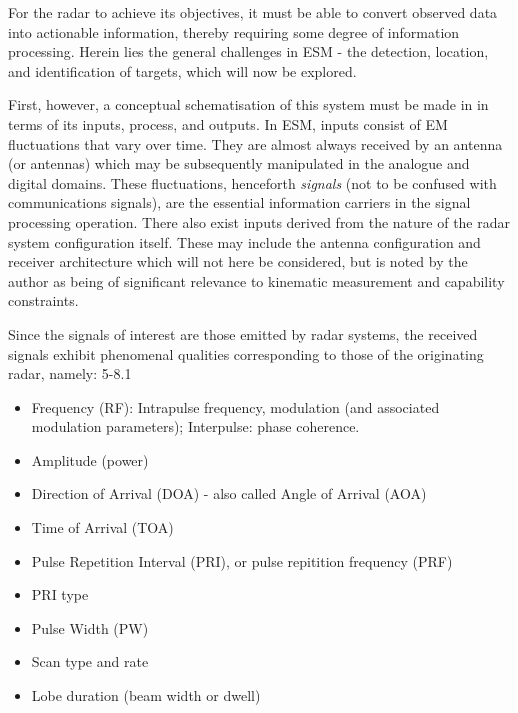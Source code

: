 

For the radar to achieve its objectives, it must be able to convert observed data into actionable information, thereby requiring some degree of information processing. Herein lies the general challenges in ESM - the detection, location, and identification of targets, which will now be explored. %

First, however, a conceptual schematisation of this system must be made in in terms of its inputs, process, and outputs. In ESM, inputs consist of EM fluctuations that vary over time. They are almost always received by an antenna (or antennas) which may be subsequently manipulated in the analogue and digital domains. These fluctuations, henceforth \textit{signals} (not to be confused with communications signals), are the essential information carriers in the signal processing operation. There also exist inputs derived from the nature of the radar system configuration itself. These may include the antenna configuration and receiver architecture which will not here be considered, but is noted by the author as being of significant relevance to kinematic measurement and capability constraints.


Since the signals of interest are those emitted by radar systems, the received signals exhibit phenomenal qualities corresponding to those of the originating radar, namely: \cite{avionics_department_electronic_2013} 5-8.1
\begin{itemize}
    \item Frequency (RF): Intrapulse frequency, modulation (and associated modulation parameters); Interpulse: phase coherence.
    \item Amplitude (power)
    \item Direction of Arrival (DOA) - also called Angle of Arrival (AOA)
    \item Time of Arrival (TOA)
    \item Pulse Repetition Interval (PRI), or pulse repitition frequency (PRF)
    \item PRI type
    \item Pulse Width (PW)
    \item Scan type and rate
    \item Lobe duration (beam width or dwell)
\end{itemize}

